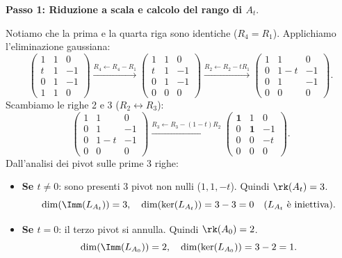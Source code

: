 \begin{dimostrazione}
\textbf{Passo 1: Riduzione a scala e calcolo del rango di $A_t$}.

Notiamo che la prima e la quarta riga sono identiche ($R_4 = R_1$). Applichiamo l'eliminazione gaussiana:
\begin{equation}
    \begin{pmatrix}
        1 & 1 & 0 \\
        t & 1 & -1 \\
        0 & 1 & -1 \\
        1 & 1 & 0
    \end{pmatrix}
    \xrightarrow{R_4 \leftarrow R_4 - R_1}
    \begin{pmatrix}
        1 & 1 & 0 \\
        t & 1 & -1 \\
        0 & 1 & -1 \\
        0 & 0 & 0
    \end{pmatrix}
    \xrightarrow{R_2 \leftarrow R_2 - t R_1}
    \begin{pmatrix}
        1 & 1 & 0 \\
        0 & 1 - t & -1 \\
        0 & 1 & -1 \\
        0 & 0 & 0
    \end{pmatrix}.
\end{equation}
Scambiamo le righe 2 e 3 ($R_2 \leftrightarrow R_3$):
\begin{equation}
    \begin{pmatrix}
        1 & 1 & 0 \\
        0 & 1 & -1 \\
        0 & 1 - t & -1 \\
        0 & 0 & 0
    \end{pmatrix}
    \xrightarrow{R_3 \leftarrow R_3 - (1-t)R_2}
    \begin{pmatrix}
        \mathbf{1} & 1 & 0 \\
        0 & \mathbf{1} & -1 \\
        0 & 0 & -t \\
        0 & 0 & 0
    \end{pmatrix}.
\end{equation}
Dall'analisi dei pivot sulle prime 3 righe:
\begin{itemize}
    \item \textbf{Se $t \neq 0$}: sono presenti 3 pivot non nulli ($1, 1, -t$). Quindi $\rk(A_t) = 3$.
    \begin{equation}
        \dim(\Imm(L_{A_t})) = 3, \quad \dim(\ker(L_{A_t})) = 3 - 3 = 0 \quad (\text{$L_{A_t}$ è iniettiva}).
    \end{equation}
    \item \textbf{Se $t = 0$}: il terzo pivot si annulla. Quindi $\rk(A_0) = 2$.
    \begin{equation}
        \dim(\Imm(L_{A_0})) = 2, \quad \dim(\ker(L_{A_0})) = 3 - 2 = 1.
    \end{equation}
\end{itemize}


\end{dimostrazione}
